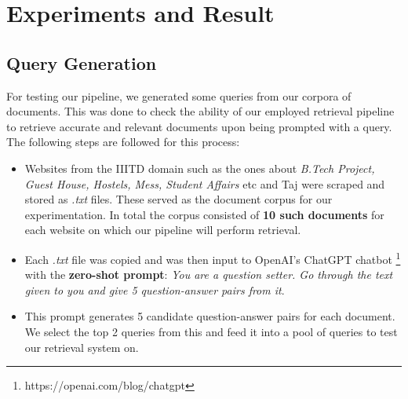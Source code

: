 \documentclass[sigconf,natbib=true,anonymous=false]{acmart}
\begin{document}
\section{Experiments and Result}
\subsection{Query Generation}
For testing our pipeline, we generated some queries from our corpora of documents. This was done to check the ability of our employed retrieval pipeline to retrieve accurate and relevant documents upon being prompted with a query. The following steps are followed for this process:
\begin{itemize}
    \item Websites from the IIITD domain such as the ones about \textit{B.Tech Project, Guest House, Hostels, Mess, Student Affairs} etc and Taj were scraped and stored as \textit{.txt} files. These served as the document corpus for our experimentation. In total the corpus consisted of \textbf{10 such documents} for each website on which our pipeline will perform retrieval.
    \item Each \textit{.txt} file was copied and was then input to OpenAI's ChatGPT chatbot \footnote{https://openai.com/blog/chatgpt} with the \textbf{zero-shot prompt}: \newline \emph{You are a question setter. Go through the text given to you and give 5 question-answer pairs from it}.
    \item This prompt generates 5 candidate question-answer pairs for each document. We select the top 2 queries from this and feed it into a pool of queries to test our retrieval system on.
\end{itemize}
\end{document}
